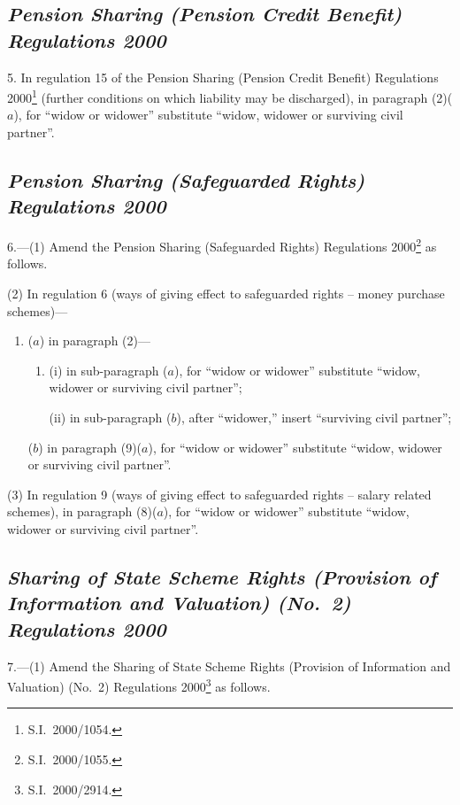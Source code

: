 \documentclass[12pt,a4paper]{article}
\begin{document}
\subsection*{\itshape Pension Sharing (Pension Credit Benefit) Regulations 2000}

5.  In regulation 15 of the Pension Sharing (Pension Credit Benefit) Regulations 2000\footnote{S.I.\ 2000/1054.} (further conditions on which liability may be discharged), in paragraph (2)($a$), for “widow or widower” substitute “widow, widower or surviving civil partner”.

\subsection*{\itshape\sloppy Pension Sharing (Safeguarded Rights) Regulations 2000}

6.---(1)  Amend the Pension Sharing (Safeguarded Rights) Regulations 2000\footnote{S.I.\ 2000/1055.} as follows.

(2) In regulation 6 (ways of giving effect to safeguarded rights – money purchase schemes)—
\begin{enumerate}\item[]
($a$) in paragraph (2)—
\begin{enumerate}\item[]
(i) in sub-paragraph ($a$), for “widow or widower” substitute “widow, widower or surviving civil partner”;

(ii) in sub-paragraph ($b$), after “widower,” insert “surviving civil partner”;
\end{enumerate}

($b$) in paragraph (9)($a$), for “widow or widower” substitute “widow, widower or surviving civil partner”.
\end{enumerate}

(3) In regulation 9 (ways of giving effect to safeguarded rights – salary related schemes), in paragraph (8)($a$), for “widow or widower” substitute “widow, widower or surviving civil partner”.

\subsection*{\itshape Sharing of State Scheme Rights (Provision of Information and Valuation) (No.\ 2) Regulations 2000}

7.---(1)  Amend the Sharing of State Scheme Rights (Provision of Information and Valuation) (No.\ 2) Regulations 2000\footnote{S.I.\ 2000/2914.} as follows.
\end{document}
